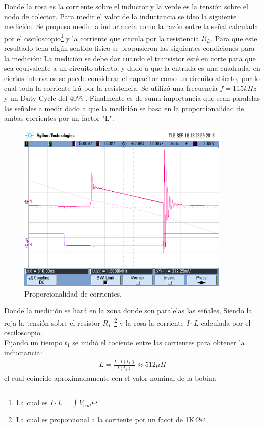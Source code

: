 Donde la rosa es la corriente sobre el inductor y la verde es la tensión sobre el nodo de colector.
Para medir el valor de la inductancia se ideo la siguiente medición.
Se  propuso medir la inductancia como la razón entre la señal calculada por el osciloscopio\footnote{La cual es $I \cdot L = \int{V_{coil}}$} y la corriente que circula por la resistencia $R_L$.
Para que este resultado tena algún sentido fisico se propusieron las siguientes condiciones para la medición:
La medición se debe dar cuando el transistor esté en corte para que sea equivalente a un circuito abierto, y dado a que la entrada es una cuadrada, en ciertos intervalos se puede considerar el capacitor como un circuito abierto, por lo cual toda la corriente irá por la resistencia.
Se utilizó una frecuencia $f= 115kHz$ y un Duty-Cycle del 40\% .
Finalmente es de suma importancia que sean paralelas las señales a medir dado a que la medición se basa en la proporcionalidad de ambas corrientes por un factor "L".
\begin{figure}[H]
	\centering
	\includegraphics[width=0.9\textwidth]{Imagenes/mentira_para_.png}
\caption{Proporcionalidad de corrientes.}
	\label{fig:Lcoil}
\end{figure}
Donde la medición se hará en la zona donde son paralelas las señales, Siendo la roja la tensión sobre el resistor $R_L$ \footnote{La cual es proporcional a la corriente por un facot de 1K$\Omega$} y la rosa la corriente $I\cdot L$ calculada por el osciloscopio.\\
Fijando un tiempo $t_1$ se midió el cociente entre las corrientes para obtener la inductancia:
\begin{align} L = \frac{ L\cdot I(t_1)}{ I ( t_1)}\approx 512 \mu H \end{align}
el cual coincide aproximadamente con el valor nominal de la bobina

